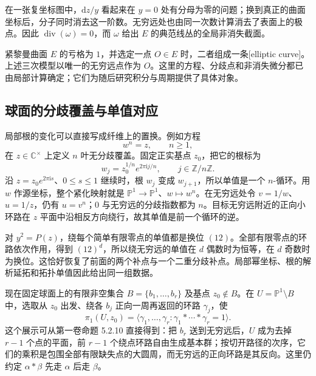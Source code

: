 在一张复坐标图中，\(\mathrm{d}z/y\) 看起来在 \(y=0\) 处有分母为零的问题；换到真正的曲面坐标后，分子同时消去这一阶数。无穷远处也由同一次数计算消去了表面上的极点。因此 \(\operatorname{div}(\omega)=0\)，而 \(\omega\) 给出 \(E\) 的典范线丛的全局非消失截面。

\ProseParagraphBreak

紧黎曼曲面 \(E\) 的亏格为 \(1\)，并选定一点 \(O\in E\) 时，二者组成一条[elliptic curve]。上述三次模型以唯一的无穷远点作为 \(O\)。这里的方程、分歧点和非消失微分都已由局部计算确定；它们为随后研究积分与周期提供了具体对象。

\subsection{球面的分歧覆盖与单值对应}
\label{g4:subsec:0204:03}

局部根的变化可以直接写成纤维上的置换。例如方程
\[
	w^n=z,\qquad n\ge1,
\]
在 \(z\in\mathbb C^\times\) 上定义 \(n\) 叶无分歧覆盖。固定正实基点 \(z_0\)，把它的根标为
\[
	w_j=z_0^{1/n}e^{2\pi\mathrm{i} j/n},\qquad j\in\mathbb Z/n\mathbb Z.
\]
沿 \(z=z_0e^{2\pi\mathrm{i} s}\)、\(0\le s\le1\) 继续时，根 \(w_j\) 变成 \(w_{j+1}\)，所以单值是一个 \(n\)-循环。用 \(w\) 作源坐标，整个紧化映射就是 \(\mathbb P^1\to\mathbb P^1\)、\(w\mapsto w^n\)。在无穷远处令 \(v=1/w\)、\(u=1/z\)，仍有 \(u=v^n\)；\(0\) 与无穷远的分歧指数都为 \(n\)。目标无穷远附近的正向小环路在 \(z\) 平面中沿相反方向绕行，故其单值是前一个循环的逆。

\ProseParagraphBreak

对 \(y^2=P(z)\)，绕每个简单有限零点的单值都是换位 \((12)\)。全部有限零点的环路依次作用，得到 \((12)^d\)，所以绕无穷远的单值在 \(d\) 偶数时为恒等，在 \(d\) 奇数时为换位。这恰好恢复了前面的两个补点与一个二重分歧补点。局部幂坐标、根的解析延拓和拓扑单值因此给出同一组数据。

\ProseParagraphBreak

现在固定球面上的有限非空集合 \(B=\{b_1,\ldots,b_r\}\) 及基点 \(z_0\notin B\)。在 \(U=\mathbb P^1\setminus B\) 中，选取从 \(z_0\) 出发、绕各 \(b_j\) 正向一周再返回的环路 \(\gamma_j\)，使
\[
	\pi_1(U,z_0)=
	\langle\gamma_1,\ldots,\gamma_r:
	\gamma_1*\cdots*\gamma_r=1\rangle.
\]
这个展示可从第一卷命题 5.2.10 直接得到：把 \(b_r\) 送到无穷远后，\(U\) 成为去掉 \(r-1\) 个点的平面，前 \(r-1\) 个绕点环路自由生成基本群；按切开路径的次序，它们的乘积是包围全部有限缺失点的大圆周，而无穷远的正向环路是其反向。这里仍约定 \(\alpha*\beta\) 先走 \(\alpha\) 后走 \(\beta\)。

